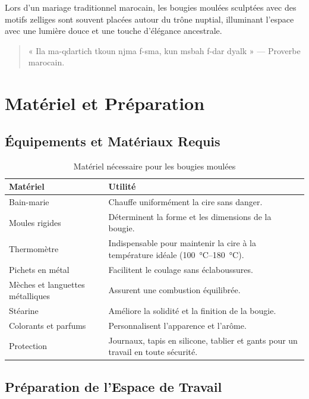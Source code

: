 \documentclass[11pt,fleqn,onecolumn,oneside]{book}
\begin{document}
\begin{example}
Lors d'un mariage traditionnel marocain, les bougies moulées sculptées avec des motifs zelliges sont souvent placées autour du trône nuptial, illuminant l'espace avec une lumière douce et une touche d'élégance ancestrale.
\end{example}


\begin{quote}
« Ila ma-qdartich tkoun njma f-sma, kun msbah f-dar dyalk » — Proverbe marocain.
\end{quote}

\section{Matériel et Préparation}

\subsection*{Équipements et Matériaux Requis}

\begin{table}[H]
\centering
\begin{tabular}{|p{4cm}|p{8cm}|}
\hline
\rowcolor{gray!20}\textbf{Matériel} & \textbf{Utilité} \\ \hline
Bain-marie & Chauffe uniformément la cire sans danger. \\ \hline
Moules rigides & Déterminent la forme et les dimensions de la bougie. \\ \hline
Thermomètre & Indispensable pour maintenir la cire à la température idéale (\SIrange{100}{180}{\degreeCelsius}). \\ \hline
Pichets en métal & Facilitent le coulage sans éclaboussures. \\ \hline
Mèches et languettes métalliques & Assurent une combustion équilibrée. \\ \hline
Stéarine & Améliore la solidité et la finition de la bougie. \\ \hline
Colorants et parfums & Personnalisent l’apparence et l’arôme. \\ \hline
Protection & Journaux, tapis en silicone, tablier et gants pour un travail en toute sécurité. \\ \hline
\end{tabular}
\caption{Matériel nécessaire pour les bougies moulées}
\end{table}

\subsection*{Préparation de l’Espace de Travail}
\end{document}

